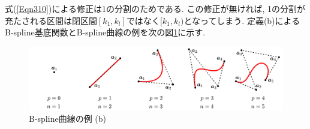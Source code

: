 \documentclass{jsarticle}
\theoremstyle{definition}%
\begin{document}
式(\ref{Eqn310})による修正は1の分割のためである.
この修正が無ければ, 1の分割が充たされる区間は閉区間$[k_1,k_l]$ではなく$[k_1,k_l)$となってしまう.
定義(b)によるB-spline基底関数とB-spline曲線の例を次の図\ref{Fig300b}に示す.
\addtocounter{footnote}{-1}
\begin{figure}[H]
	\centering
    \includegraphics[page=16,clip,width=160mm]{fig.pdf}
    \caption{B-spline曲線の例 (b)\protect\footnotemark}
	\label{Fig300b}
\end{figure}
\end{document}
